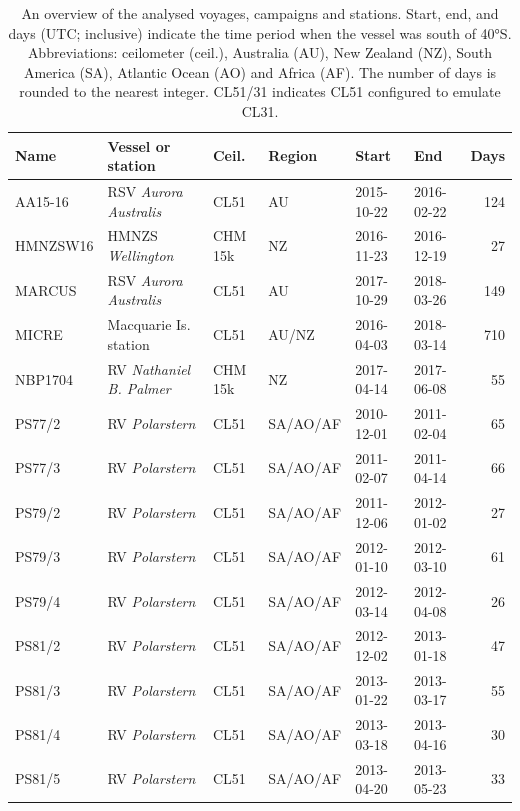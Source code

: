 \documentclass[12pt,a4paper]{article}
\begin{document}
\begin{table}[p!]
\caption{
An overview of the analysed voyages, campaigns and stations. Start, end, and days
(UTC; inclusive) indicate the time period when the vessel was south of 40°S.
Abbreviations: ceilometer (ceil.), Australia (AU), New Zealand (NZ), South
America (SA), Atlantic Ocean (AO) and Africa (AF). The number of days is
rounded to the nearest integer. CL51/31 indicates CL51 configured to emulate
CL31.
}
\label{tab:voyages}
\small
\begin{tabular}{llllllr}
\textbf{Name} & \textbf{Vessel or station} & \textbf{Ceil.} & \textbf{Region} & \textbf{Start} & \textbf{End} & \textbf{Days}\\
\hline
AA15-16  & RSV \emph{Aurora Australis}   & CL51    & AU       & 2015-10-22 & 2016-02-22 & 124 \\
HMNZSW16 & HMNZS \emph{Wellington}       & CHM 15k & NZ       & 2016-11-23 & 2016-12-19 & 27 \\
MARCUS   & RSV \emph{Aurora Australis}   & CL51    & AU       & 2017-10-29 & 2018-03-26 & 149 \\
MICRE    & Macquarie Is. station         & CL51    & AU/NZ    & 2016-04-03 & 2018-03-14 & 710 \\
NBP1704  & RV \emph{Nathaniel B. Palmer} & CHM 15k & NZ       & 2017-04-14 & 2017-06-08 & 55 \\
PS77/2   & RV \emph{Polarstern}          & CL51    & SA/AO/AF & 2010-12-01 & 2011-02-04 & 65 \\
PS77/3   & RV \emph{Polarstern}          & CL51    & SA/AO/AF & 2011-02-07 & 2011-04-14 & 66 \\
PS79/2   & RV \emph{Polarstern}          & CL51    & SA/AO/AF & 2011-12-06 & 2012-01-02 & 27 \\
PS79/3   & RV \emph{Polarstern}          & CL51    & SA/AO/AF & 2012-01-10 & 2012-03-10 & 61 \\
PS79/4   & RV \emph{Polarstern}          & CL51    & SA/AO/AF & 2012-03-14 & 2012-04-08 & 26 \\
PS81/2   & RV \emph{Polarstern}          & CL51    & SA/AO/AF & 2012-12-02 & 2013-01-18 & 47 \\
PS81/3   & RV \emph{Polarstern}          & CL51    & SA/AO/AF & 2013-01-22 & 2013-03-17 & 55 \\
PS81/4   & RV \emph{Polarstern}          & CL51    & SA/AO/AF & 2013-03-18 & 2013-04-16 & 30 \\
PS81/5   & RV \emph{Polarstern}          & CL51    & SA/AO/AF & 2013-04-20 & 2013-05-23 & 33 \\

\end{tabular}
\end{table}
\end{document}
